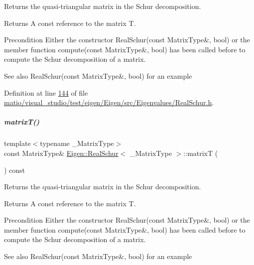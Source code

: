 Returns the quasi-\/triangular matrix in the Schur decomposition. 

\begin{DoxyReturn}{Returns}
A const reference to the matrix T.
\end{DoxyReturn}
\begin{DoxyPrecond}{Precondition}
Either the constructor Real\+Schur(const Matrix\+Type\&, bool) or the member function compute(const Matrix\+Type\&, bool) has been called before to compute the Schur decomposition of a matrix.
\end{DoxyPrecond}
\begin{DoxySeeAlso}{See also}
Real\+Schur(const Matrix\+Type\&, bool) for an example 
\end{DoxySeeAlso}


Definition at line \hyperlink{matio_2visual__studio_2test_2eigen_2_eigen_2src_2_eigenvalues_2_real_schur_8h_source_l00144}{144} of file \hyperlink{matio_2visual__studio_2test_2eigen_2_eigen_2src_2_eigenvalues_2_real_schur_8h_source}{matio/visual\+\_\+studio/test/eigen/\+Eigen/src/\+Eigenvalues/\+Real\+Schur.\+h}.

\mbox{\label{group___eigenvalues___module_abb78996b43b8642a5f507415730445cb}} 
\subparagraph{\texorpdfstring{matrix\+T()}{matrixT()}\hspace{0.1cm}{\footnotesize\ttfamily [2/2]}}
{\footnotesize\ttfamily template$<$typename \+\_\+\+Matrix\+Type$>$ \\
const Matrix\+Type\& \hyperlink{group___eigenvalues___module_class_eigen_1_1_real_schur}{Eigen\+::\+Real\+Schur}$<$ \+\_\+\+Matrix\+Type $>$\+::matrixT (\begin{DoxyParamCaption}{ }\end{DoxyParamCaption}) const\hspace{0.3cm}{\ttfamily [inline]}}



Returns the quasi-\/triangular matrix in the Schur decomposition. 

\begin{DoxyReturn}{Returns}
A const reference to the matrix T.
\end{DoxyReturn}
\begin{DoxyPrecond}{Precondition}
Either the constructor Real\+Schur(const Matrix\+Type\&, bool) or the member function compute(const Matrix\+Type\&, bool) has been called before to compute the Schur decomposition of a matrix.
\end{DoxyPrecond}
\begin{DoxySeeAlso}{See also}
Real\+Schur(const Matrix\+Type\&, bool) for an example 
\end{DoxySeeAlso}


